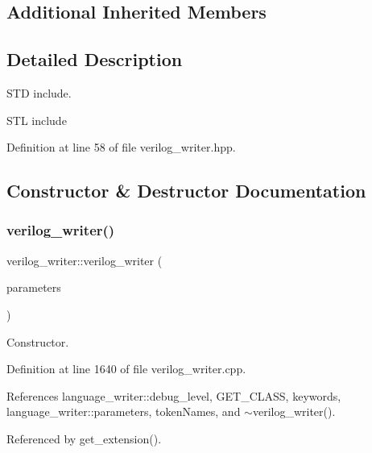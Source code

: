 \subsection*{Additional Inherited Members}


\subsection{Detailed Description}
S\+TD include. 

S\+TL include 

Definition at line 58 of file verilog\+\_\+writer.\+hpp.



\subsection{Constructor \& Destructor Documentation}
\mbox{\label{classverilog__writer_aa53cae880dfdd2adb20a47887f8a2a70}} 
\subsubsection{\texorpdfstring{verilog\+\_\+writer()}{verilog\_writer()}}
{\footnotesize\ttfamily verilog\+\_\+writer\+::verilog\+\_\+writer (\begin{DoxyParamCaption}\item[{const \hyperlink{Parameter_8hpp_a37841774a6fcb479b597fdf8955eb4ea}{Parameter\+Const\+Ref}}]{parameters }\end{DoxyParamCaption})\hspace{0.3cm}{\ttfamily [explicit]}}



Constructor. 



Definition at line 1640 of file verilog\+\_\+writer.\+cpp.



References language\+\_\+writer\+::debug\+\_\+level, G\+E\+T\+\_\+\+C\+L\+A\+SS, keywords, language\+\_\+writer\+::parameters, token\+Names, and $\sim$verilog\+\_\+writer().



Referenced by get\+\_\+extension().


